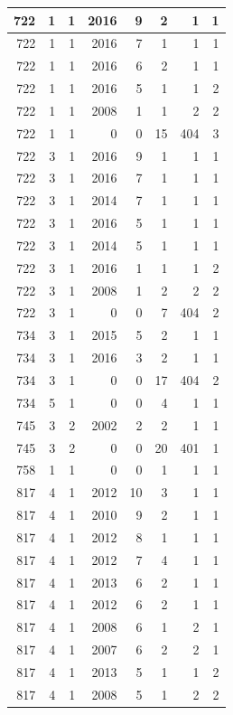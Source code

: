 \documentclass[11pt,]{book}
\begin{document}
\begin{table}
\begin{tabular}[t]{r|r|r|r|r|r|r|r}
\hline
722 & 1 & 1 & 2016 & 9 & 2 & 1 & 1\\
\hline
722 & 1 & 1 & 2016 & 7 & 1 & 1 & 1\\
\hline
722 & 1 & 1 & 2016 & 6 & 2 & 1 & 1\\
\hline
722 & 1 & 1 & 2016 & 5 & 1 & 1 & 2\\
\hline
722 & 1 & 1 & 2008 & 1 & 1 & 2 & 2\\
\hline
722 & 1 & 1 & 0 & 0 & 15 & 404 & 3\\
\hline
722 & 3 & 1 & 2016 & 9 & 1 & 1 & 1\\
\hline
722 & 3 & 1 & 2016 & 7 & 1 & 1 & 1\\
\hline
722 & 3 & 1 & 2014 & 7 & 1 & 1 & 1\\
\hline
722 & 3 & 1 & 2016 & 5 & 1 & 1 & 1\\
\hline
722 & 3 & 1 & 2014 & 5 & 1 & 1 & 1\\
\hline
722 & 3 & 1 & 2016 & 1 & 1 & 1 & 2\\
\hline
722 & 3 & 1 & 2008 & 1 & 2 & 2 & 2\\
\hline
722 & 3 & 1 & 0 & 0 & 7 & 404 & 2\\
\hline
734 & 3 & 1 & 2015 & 5 & 2 & 1 & 1\\
\hline
734 & 3 & 1 & 2016 & 3 & 2 & 1 & 1\\
\hline
734 & 3 & 1 & 0 & 0 & 17 & 404 & 2\\
\hline
734 & 5 & 1 & 0 & 0 & 4 & 1 & 1\\
\hline
745 & 3 & 2 & 2002 & 2 & 2 & 1 & 1\\
\hline
745 & 3 & 2 & 0 & 0 & 20 & 401 & 1\\
\hline
758 & 1 & 1 & 0 & 0 & 1 & 1 & 1\\
\hline
817 & 4 & 1 & 2012 & 10 & 3 & 1 & 1\\
\hline
817 & 4 & 1 & 2010 & 9 & 2 & 1 & 1\\
\hline
817 & 4 & 1 & 2012 & 8 & 1 & 1 & 1\\
\hline
817 & 4 & 1 & 2012 & 7 & 4 & 1 & 1\\
\hline
817 & 4 & 1 & 2013 & 6 & 2 & 1 & 1\\
\hline
817 & 4 & 1 & 2012 & 6 & 2 & 1 & 1\\
\hline
817 & 4 & 1 & 2008 & 6 & 1 & 2 & 1\\
\hline
817 & 4 & 1 & 2007 & 6 & 2 & 2 & 1\\
\hline
817 & 4 & 1 & 2013 & 5 & 1 & 1 & 2\\
\hline
817 & 4 & 1 & 2008 & 5 & 1 & 2 & 2\\
\hline

\end{tabular}
\end{table}
\end{document}
